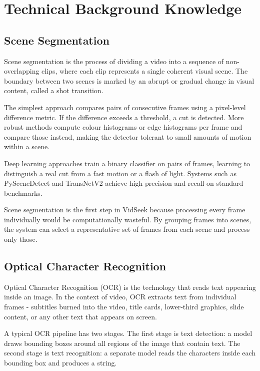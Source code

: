 \documentclass[12pt, a4paper]{report}
\begin{document}
\section{Technical Background Knowledge}

\subsection{Scene Segmentation}

Scene segmentation is the process of dividing a video into a sequence of
non-overlapping clips, where each clip represents a single coherent visual
scene. The boundary between two scenes is marked by an abrupt or gradual
change in visual content, called a shot transition.

The simplest approach compares pairs of consecutive frames using a pixel-level
difference metric. If the difference exceeds a threshold, a cut is detected.
More robust methods compute colour histograms or edge histograms per frame
and compare those instead, making the detector tolerant to small amounts of
motion within a scene.

Deep learning approaches train a binary classifier on pairs of frames, learning
to distinguish a real cut from a fast motion or a flash of light. Systems
such as PySceneDetect and TransNetV2 achieve high precision and recall
on standard benchmarks.

Scene segmentation is the first step in VidSeek because processing every
frame individually would be computationally wasteful. By grouping frames
into scenes, the system can select a representative set of frames from each
scene and process only those.

\subsection{Optical Character Recognition}

Optical Character Recognition (OCR) is the technology that reads text
appearing inside an image. In the context of video, OCR extracts text
from individual frames - subtitles burned into the video, title cards,
lower-third graphics, slide content, or any other text that appears on screen.

A typical OCR pipeline has two stages. The first stage is text detection:
a model draws bounding boxes around all regions of the image that contain
text. The second stage is text recognition: a separate model reads the
characters inside each bounding box and produces a string.
\end{document}
